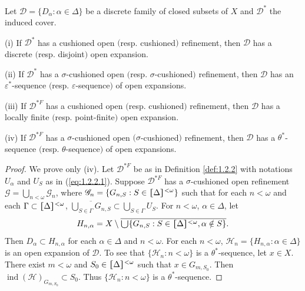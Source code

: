 \documentclass[prelim.tex]{subfiles}
\begin{document}
{\lemma{} \label{lem:1.2.4}
Let $\mathscr{D} = \{D_\alpha: \alpha \in \Delta\}$ be a discrete family
of closed subsets of $X$ and $\mathscr{D}^*$ the induced cover.

\textup{(i)}  If $\mathscr{D}^*$ has a cushioned open $($resp. cushioned$)$ refinement, 
then $\mathscr{D}$ has a discrete $($resp. disjoint$)$ open expansion.

\textup{(ii)}  If $\mathscr{D}^*$ has a  $\sigma$-cushioned open 
$($resp. $\sigma$-cushioned$)$ 
 refinement, then $\mathscr{D}$ has an $\varepsilon^*$-sequence 
 $($resp. $\varepsilon$-sequence$)$ 
 of open expansions.

\textup{(iii)}  If $\mathscr{D}^{*F}$ has a cushioned open $($resp. cushioned$)$ 
refinement, then $\mathscr{D}$ 
has a locally finite $($resp. point-finite$)$ open expansion.

\textup{(iv)}  If $\mathscr{D}^{*F}$ has a $\sigma$-cushioned open 
$(\sigma$-cushioned$)$ 
refinement, then $\mathscr{D}$ has a $\theta^*$-sequence 
$($resp. $\theta$-sequence$)$ of open expansions.
}%

\begin{proof} 
We prove only (iv). 
Let $\mathscr{D}^{*F}$ be as in Definition \ref{def:1.2.2} with notations $U_\alpha$ 
and $U_S$ as in (\ref{eq:1.2.2.1}). 
Suppose $\mathscr{D}^{*F}$  has a
$\sigma$-cushioned open refinement
$\mathscr{G} = \bigcup_{n<\omega} \mathscr{G}_{n}$, where 
$\mathscr{G}_{n} = \{G_{n, S}: S\in \hstretch{1.8}{[}\Delta\hstretch{1.8}{]}^{<\omega}\}$ 
such that for each $n<\omega$ and each $\Gamma\subset \hstretch{1.8}{[}\Delta\hstretch{1.8}{]}^{<\omega}$,  
$\overline{\bigcup_{S\in\Gamma} G_{n,S}} \subset \bigcup_{S\in\Gamma} U_S$. For $n<\omega$, $\alpha\in \Delta$, let
$$H_{n,\alpha} = X \setminus \overline{ \raisebox{-2pt}{\scalebox{1.5}{$\cup$}} \{G_{n,S}: 
S\in \hstretch{1.8}{[}\Delta\hstretch{1.8}{]}^{<\omega}, \alpha\notin S\}}.$$
Then $D_\alpha \subset H_{n,\alpha}$ for each $\alpha \in \Delta$ and $n<\omega$. 
For each $n<\omega$, $\mathscr{H}_{n} = \{H_{n,\alpha}: \alpha \in \Delta\}$ 
is an open expansion of $\mathscr{D}$. 
To see that $\{\mathscr{H}_n: n<\omega\}$ is a $\theta^*$-sequence, let $x \in X$. 
There exist $m<\omega$ and $S_0 \in \hstretch{1.8}{[}\Delta\hstretch{1.8}{]}^{<\omega}$ 
such that $x \in G_{m, S_0}$. 
Then $\operatorname{ind} (\mathscr{H})_{G_{m,S_0}}\subset S_0$. 
Thus $\{\mathscr{H}_n: n<\omega\}$ is a $\theta^*$-sequence.
\end{proof} 
\end{document}
